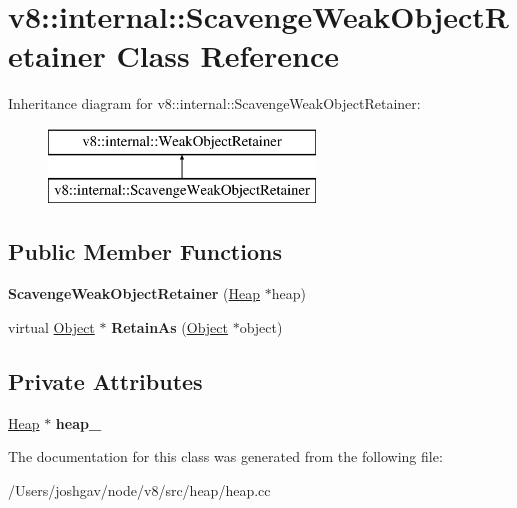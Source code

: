 \hypertarget{classv8_1_1internal_1_1_scavenge_weak_object_retainer}{}\section{v8\+:\+:internal\+:\+:Scavenge\+Weak\+Object\+Retainer Class Reference}
\label{classv8_1_1internal_1_1_scavenge_weak_object_retainer}
Inheritance diagram for v8\+:\+:internal\+:\+:Scavenge\+Weak\+Object\+Retainer\+:\begin{figure}[H]
\begin{center}
\leavevmode
\includegraphics[height=2.000000cm]{classv8_1_1internal_1_1_scavenge_weak_object_retainer}
\end{center}
\end{figure}
\subsection*{Public Member Functions}
\begin{DoxyCompactItemize}
\item 
{\bfseries Scavenge\+Weak\+Object\+Retainer} (\hyperlink{classv8_1_1internal_1_1_heap}{Heap} $\ast$heap)\hypertarget{classv8_1_1internal_1_1_scavenge_weak_object_retainer_a246f236cb88cdffa69caf4a30188e592}{}\label{classv8_1_1internal_1_1_scavenge_weak_object_retainer_a246f236cb88cdffa69caf4a30188e592}

\item 
virtual \hyperlink{classv8_1_1internal_1_1_object}{Object} $\ast$ {\bfseries Retain\+As} (\hyperlink{classv8_1_1internal_1_1_object}{Object} $\ast$object)\hypertarget{classv8_1_1internal_1_1_scavenge_weak_object_retainer_ac3730e9e77b2e5d5050ae52bbbfbff71}{}\label{classv8_1_1internal_1_1_scavenge_weak_object_retainer_ac3730e9e77b2e5d5050ae52bbbfbff71}

\end{DoxyCompactItemize}
\subsection*{Private Attributes}
\begin{DoxyCompactItemize}
\item 
\hyperlink{classv8_1_1internal_1_1_heap}{Heap} $\ast$ {\bfseries heap\+\_\+}\hypertarget{classv8_1_1internal_1_1_scavenge_weak_object_retainer_ac006ea9fd939007bc9f94cc4c96142bd}{}\label{classv8_1_1internal_1_1_scavenge_weak_object_retainer_ac006ea9fd939007bc9f94cc4c96142bd}

\end{DoxyCompactItemize}


The documentation for this class was generated from the following file\+:\begin{DoxyCompactItemize}
\item 
/\+Users/joshgav/node/v8/src/heap/heap.\+cc\end{DoxyCompactItemize}
